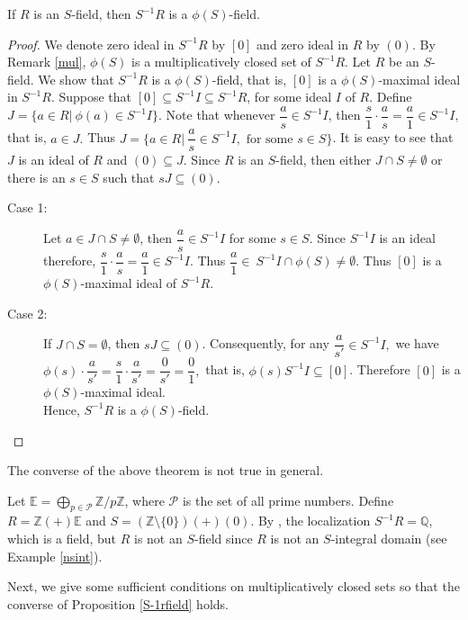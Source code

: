 \documentclass[11pt]{article}
\begin{document}
	
	\begin{prop} \label{S-1rfield}
		If $R$ is an $S$-field, then $S^{-1}R$ is a $\phi(S)$-field.
	\end{prop}
	\begin{proof}
		We denote zero ideal in $S^{-1}R$ by $[0]$ and zero ideal in $R$ by $(0)$. By Remark \ref{mul}, $\phi(S)$ is a multiplicatively closed set of $S^{-1}R.$ Let $R$ be an $S$-field. We show that $S^{-1}R$ is a $\phi(S)$-field, that is, $[0]$ is a $\phi(S)$-maximal ideal in $S^{-1}R$. Suppose that $[0]\subseteq S^{-1} I\subseteq S^{-1}R$, for some ideal $I$ of $R$. 
		Define $J=\{a\in R| \ \phi(a)\in S^{-1}I\}.$ Note that whenever $\dfrac{a}{s}\in S^{-1}I$, then $\dfrac{s}{1}\cdot \dfrac{a}{s}=\dfrac{a}{1}\in S^{-1}I,$ that is, $a\in J.$ Thus $J=\{a\in R| \ \dfrac{a}{s}\in S^{-1}I, \text{ for some } s\in S\}$. It is easy to see that $J$ is an ideal of $R$ and $(0)\subseteq J$. Since $R$ is an $S$-field, then either $J\cap S\neq \emptyset$ or there is an $s\in S$ such that $sJ\subseteq(0)$.
		\begin{description}
			\item[Case 1:]Let $a\in J\cap S\neq \emptyset$, then $\dfrac{a}{s}\in S^{-1}I$ for some $s\in S$. Since $S^{-1}I$ is an ideal therefore, $\dfrac{s}{1}\cdot\dfrac{a}{s}=\dfrac{a}{1}\in S^{-1}I$. Thus $\dfrac{a}{1}\in~S^{-1}I\cap\phi(S)\neq \emptyset$. Thus $[0]$ is a $\phi(S)$-maximal ideal of $S^{-1}R$.
			\item[Case 2:] If $J\cap S=\emptyset$, then $sJ\subseteq(0)$. Consequently, for any $\dfrac{a}{s'}\in S^{-1}I,$ we have $\phi(s)\cdot\dfrac{a}{s'}=\dfrac{s}{1}\cdot\dfrac{a}{s'}=\dfrac{0}{s'}=\dfrac{0}{1},$ that is, $\phi(s)S^{-1}I\subseteq [0]$. Therefore $[0]$ is a $\phi(S)$-maximal ideal.\\ Hence, $S^{-1}R$ is a $\phi(S)$-field.
		\end{description}
	\end{proof}
	The converse of the above theorem is not true in general. 
	\begin{eg}\label{sexample}
		Let $\mathbb{E}=\bigoplus_{p\in\mathcal{P}}\mathbb{Z}/p\mathbb{Z}$, where $\mathcal{P}$ is the set of all prime numbers. Define $R=\mathbb{Z}(+)\mathbb{E}$ and $S= (\mathbb{Z}\setminus\{0\}) (+)(0)$. By \cite[Example 3.12]{ki24}, the localization 
	$S^{-1}R=\mathbb{Q}$, which is a field, but $R$ is not an $S$-field since $R$ is not an $S$-integral domain (see Example \ref{nsint}).
	\end{eg}
	Next, we give some sufficient conditions on multiplicatively closed sets so that the converse of  Proposition \ref{S-1rfield} holds.
\end{document}
